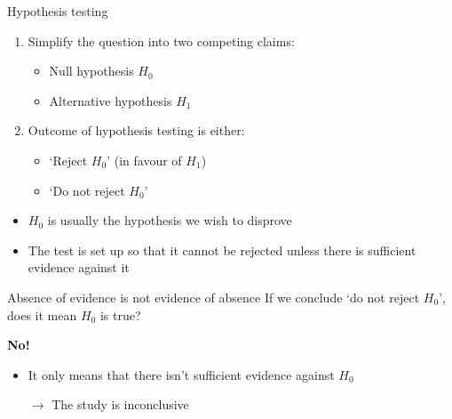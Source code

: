 \begin{frame}{Hypothesis testing}
    \begin{enumerate}
        \item Simplify the question into two competing claims:
              \begin{itemize}
                  \item Null hypothesis $H_{0}$
                  \item Alternative hypothesis $H_{1}$ \\[\medskipamount]
              \end{itemize}
        \item Outcome of hypothesis testing is either:
              \begin{itemize}
                  \item `Reject $H_{0}$' (in favour of $H_{1}$)
                  \item `Do not reject $H_{0}$'
              \end{itemize}
    \end{enumerate}
    \vfill
    \begin{itemize}
        \item $H_{0}$ is usually the hypothesis we wish to \alert{disprove}
        \item The test is set up so that it cannot be rejected unless there is
              \alert{sufficient evidence against it}
    \end{itemize}
\end{frame}

\begin{frame}{Absence of evidence is not evidence of absence}
    If we conclude `do not reject $H_{0}$', does it mean $H_{0}$ is true?
    \vfill\pause
    \begin{center}
        \LARGE%
        \textbf{No!}
    \end{center}
    \begin{itemize}
        \item It only means that \alert{there isn't sufficient evidence against
              $H_{0}$}
        \item[$\rightarrow$] The study is inconclusive
    \end{itemize}
\end{frame}

